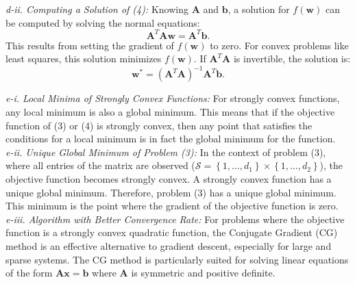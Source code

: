 \documentclass[12pt]{article}
\begin{document}
    \textit{d-ii. Computing a Solution of (4):}
    Knowing \(\boldsymbol{A}\) and \(\boldsymbol{b}\), a solution for \(f(\boldsymbol{w})\) can be computed by solving the normal equations:
    \[
        \boldsymbol{A}^T\boldsymbol{A} \boldsymbol{w} = \boldsymbol{A}^T\boldsymbol{b}.
    \]
    This results from setting the gradient of \(f(\boldsymbol{w})\) to zero. For convex problems like least squares, this solution minimizes \(f(\boldsymbol{w})\). If \(\boldsymbol{A}^T\boldsymbol{A}\) is invertible, the solution is:
    \[
        \boldsymbol{w}^* = (\boldsymbol{A}^T\boldsymbol{A})^{-1}\boldsymbol{A}^T\boldsymbol{b}.
    \]


    \textit{e-i. Local Minima of Strongly Convex Functions:}
    For strongly convex functions, any local minimum is also a global minimum. This means that if the objective function of (3) or (4) is strongly convex, then any point that satisfies the conditions for a local minimum is in fact the global minimum for the function.\\

    \textit{e-ii. Unique Global Minimum of Problem (3):}
    In the context of problem (3), where all entries of the matrix are observed (\(\mathcal{S}=\left\{1, \ldots, d_{1}\right\} \times\left\{1, \ldots, d_{2}\right\}\)), the objective function becomes strongly convex. A strongly convex function has a unique global minimum. Therefore, problem (3) has a unique global minimum. This minimum is the point where the gradient of the objective function is zero.\\

    \textit{e-iii. Algorithm with Better Convergence Rate:}
    For problems where the objective function is a strongly convex quadratic function, the Conjugate Gradient (CG) method is an effective alternative to gradient descent, especially for large and sparse systems. The CG method is particularly suited for solving linear equations of the form \(\boldsymbol{A} \boldsymbol{x} = \boldsymbol{b}\) where \(\boldsymbol{A}\) is symmetric and positive definite.
\end{document}

